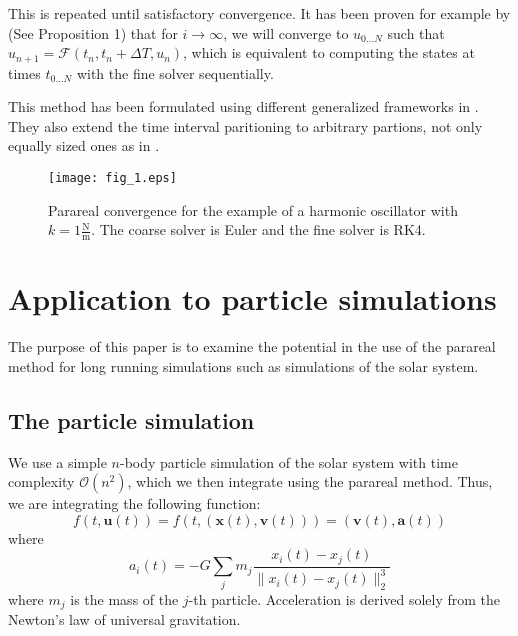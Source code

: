 \documentclass[conference]{IEEEtran}
\begin{document}
This is repeated until satisfactory convergence. It has been proven for example by \cite{parareal} (See Proposition 1) that for $i \to \infty$, we will converge to $u_{0\dots N}$ such that $u_{n+1} = \mathcal{F}(t_n, t_n+\Delta T, u_n)$, which is equivalent to computing the states at times $t_{0\dots N}$ with the fine solver sequentially.

This method has been formulated using different generalized frameworks in \cite{parareal2}. They also extend the time interval paritioning to arbitrary partions, not only equally sized ones as in \cite{parareal}.

\begin{figure}[htbp]
\centerline{\texttt{[image: fig\_1.eps]}}
\caption{Parareal convergence for the example of a harmonic oscillator with $k = 1\frac{\text{N}}{\text{m}}$. The coarse solver is Euler and the fine solver is RK4.}
\label{oscillator}
\end{figure}

\section{Application to particle simulations}
The purpose of this paper is to examine the potential in the use of the parareal method for long running simulations such as simulations of the solar system. 

\subsection{The particle simulation}
We use a simple $n$-body particle simulation of the solar system with time complexity $\mathcal{O}(n^2)$, which we then integrate using the parareal method. Thus, we are integrating the following function:
$$
f(t, \mathbf{u}(t)) = f(t, (\mathbf{x}(t), \mathbf{v}(t))) = (\mathbf{v}(t), \mathbf{a}(t))
$$
where 
$$
a_i(t) = -G \sum_j m_j\frac{x_i(t)-x_j(t)}{\|x_i(t)-x_j(t)\|_2^3}
$$
where $m_j$ is the mass of the $j$-th particle. Acceleration is derived solely from the Newton's law of universal gravitation.
\end{document}
